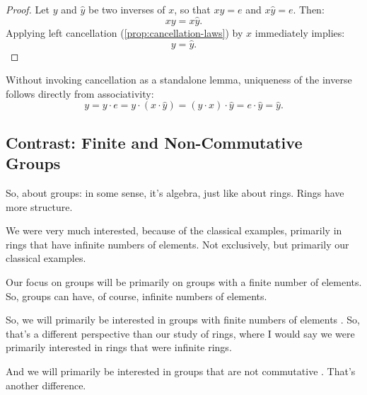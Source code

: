 \begin{content}
\begin{proof}
Let $y$ and $\hat{y}$ be two inverses of $x$, so that $x y = e$ and $x \hat{y} = e$. Then:
\[
x y = x \hat{y}.
\]
Applying left cancellation (\cref{prop:cancellation-laws}) by $x$ immediately implies:
\[
y = \hat{y}.
\]
\end{proof}

\begin{steps}
Without invoking cancellation as a standalone lemma, uniqueness of the inverse follows directly from associativity:
\[
y = y \cdot e = y \cdot (x \cdot \hat{y}) = (y \cdot x) \cdot \hat{y} = e \cdot \hat{y} = \hat{y}.
\]
\end{steps}
\end{content}

\begin{hidden}
\end{hidden}

\subsection{Contrast: Finite and Non-Commutative Groups}

\begin{speech}[00:48:17 - 00:49:46]
So, about groups: in some sense, it's algebra, just like about rings. Rings have more structure.

We were very much interested, because of the classical examples, primarily in rings that have infinite numbers of elements. Not exclusively, but primarily our classical examples.

Our focus on groups will be primarily on groups with a finite number of elements. So, groups can have, of course, infinite numbers of elements.

So, we will primarily be interested in groups with finite numbers of elements . So, that's a different perspective than our study of rings, where I would say we were primarily interested in rings that were infinite rings.

And we will primarily be interested in groups that are not commutative . That's another difference.
\end{speech}

